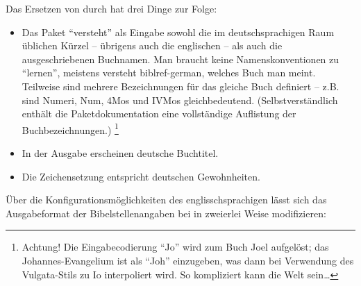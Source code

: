 
Das Ersetzen von  durch  hat 
drei Dinge zur Folge:

\begin{itemize}
    \item Das Paket \enquote{versteht} als Eingabe sowohl die im deutschsprachigen Raum üblichen Kürzel -- übrigens
    auch die englischen -- als auch die ausgeschriebenen Buchnamen. Man braucht keine Namenskonventionen
    zu \enquote{lernen}, meistens versteht biblref-german, welches Buch man meint. 
    Teilweise sind mehrere Bezeichnungen für das gleiche Buch definiert -- z.B. sind Numeri, Num, 4Mos und
    IVMos gleichbedeutend.
    (Selbstverständlich enthält die Paketdokumentation eine vollständige Auflistung der Buchbezeichnungen.)%
    \footnote{Achtung! Die Eingabecodierung \enquote{Jo} wird zum Buch Joel aufgelöst; das Johannes-Evangelium
        ist als \enquote{Joh} einzugeben, was dann bei Verwendung des Vulgata-Stils zu Io interpoliert wird. 
        So kompliziert kann die Welt sein\ldots }
    \item In der Ausgabe erscheinen deutsche Buchtitel.
    \item Die Zeichensetzung entspricht deutschen Gewohnheiten.
\end{itemize}

Über die Konfigurationsmöglichkeiten des englisschsprachigen  lässt sich das Ausgabeformat der Bibelstellenangaben bei  in
zweierlei Weise modifizieren:

